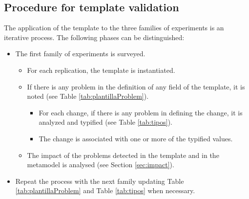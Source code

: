 


%

%
\subsection{Procedure for template validation}
\label{sec:procedure}
The application of the template to the three families of experiments is an iterative process. The following phases can be distinguished: 

\begin{itemize}
 \item The first family of experiments is surveyed. 
    \begin{itemize}
        \item For each replication, the template is instantiated.
        \item If there is any problem in the definition of any field of the template, it is noted (see Table \ref{tab:plantillaProblem}).
        \begin{itemize}
            \item For each change, if there is any problem in defining the change, it is analyzed and typified (see Table \ref{tab:tipos}).
            \item The change is associated with one or more of the typified values.
        \end{itemize}
       
        \item The impact of the problems detected in the template and in the metamodel is analysed (see Section \ref{sec:impact}). 
    \end{itemize}

  
 \item Repeat the process with the next family updating Table \ref{tab:plantillaProblem} and Table \ref{tab:tipos} when necessary.
\end{itemize}

